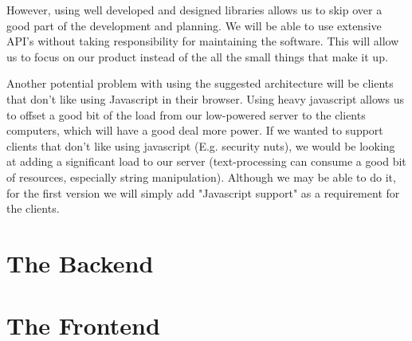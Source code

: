 However, using well developed and designed libraries allows us to skip over a good part of the development and planning.
We will be able to use extensive \ac{API}'s without taking responsibility for maintaining the software.
This will allow us to focus on our product instead of the all the small things that make it up.


Another potential problem with using the suggested architecture will be clients that don't like using Javascript in their browser.
Using heavy javascript allows us to offset a good bit of the load from our low-powered server to the clients computers, which will have a good deal more power.
If we wanted to support clients that don't like using javascript (E.g. security nuts), we would be looking at adding a significant load to our server (text-processing can consume a good bit of resources, especially string manipulation).
Although we may be able to do it, for the first version we will simply add "Javascript support" as a requirement for the clients.

\section{The Backend}








\section{The Frontend}









